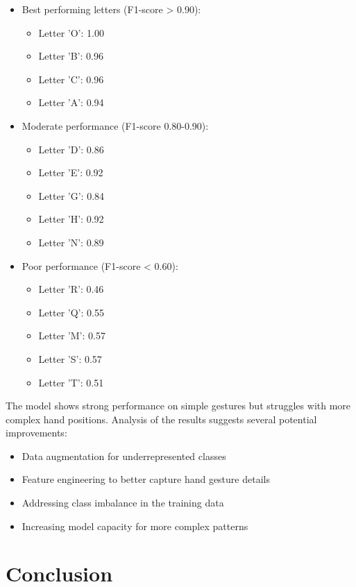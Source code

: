 \documentclass[times,final,english]{revdetua}
\begin{document}
\begin{itemize}
    \item Best performing letters (F1-score > 0.90):
    \begin{itemize}
        \item Letter 'O': 1.00
        \item Letter 'B': 0.96
        \item Letter 'C': 0.96
        \item Letter 'A': 0.94
    \end{itemize}
    \item Moderate performance (F1-score 0.80-0.90):
    \begin{itemize}
        \item Letter 'D': 0.86
        \item Letter 'E': 0.92
        \item Letter 'G': 0.84
        \item Letter 'H': 0.92
        \item Letter 'N': 0.89
    \end{itemize}
    \item Poor performance (F1-score < 0.60):
    \begin{itemize}
        \item Letter 'R': 0.46
        \item Letter 'Q': 0.55
        \item Letter 'M': 0.57
        \item Letter 'S': 0.57
        \item Letter 'T': 0.51
    \end{itemize}
\end{itemize}

The model shows strong performance on simple gestures but struggles with more complex hand positions. Analysis of the results suggests several potential improvements:
\begin{itemize}
    \item Data augmentation for underrepresented classes
    \item Feature engineering to better capture hand gesture details
    \item Addressing class imbalance in the training data
    \item Increasing model capacity for more complex patterns
\end{itemize}

\section{Conclusion}
\end{document}
